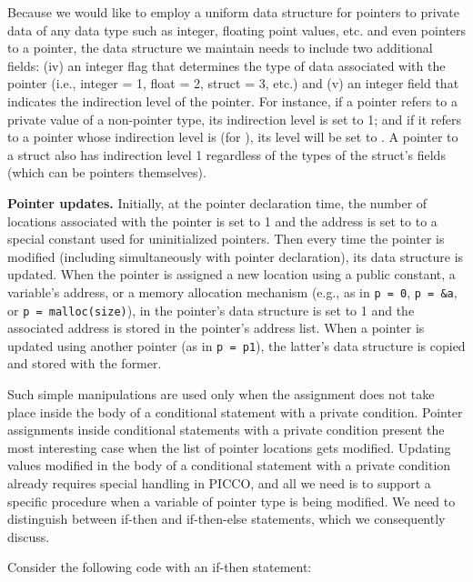 \documentclass[11pt]{article}
\begin{document}
Because we would like to employ a uniform data structure for pointers to
private data of any data type such as integer, floating point values, etc.
and even pointers to a pointer, the data structure we maintain needs to
include two additional fields: (iv) an integer flag that determines the type
of data associated with the pointer (i.e., integer = 1, float = 2, struct =
3, etc.) and (v) an integer field that indicates the indirection level of
the pointer. For instance, if a pointer refers to a private value of a
non-pointer type, its indirection level is set to 1; and if it refers to a
pointer whose indirection level is  (for ), its level will be
set to . A pointer to a struct also has indirection level 1 regardless
of the types of the struct's fields (which can be pointers themselves). 

\medskip \noindent \textbf{Pointer updates.}
Initially, at the pointer declaration time, the number of locations 
associated with the pointer is set to 1 and the address is set to to a
special constant used for uninitialized pointers. Then every time the
pointer is modified (including simultaneously with pointer declaration), its
data structure is updated. When the pointer is assigned a new location using
a public constant, a variable's address, or a memory allocation mechanism
(e.g., as in \texttt{p = 0}, \texttt{p = \&a}, or \texttt{p =
malloc(size)}),  in the pointer's data structure is set to 1 and the
associated address is stored in the pointer's address list. When a pointer
is updated using another pointer (as in \texttt{p = p1}), the latter's
data structure is copied and stored with the former. 

Such simple manipulations are used only when the assignment does not take
place inside the body of a conditional statement with a private condition.
Pointer assignments inside conditional statements with a private condition
present the most interesting case when the list of pointer locations gets
modified. Updating values modified in the body of a conditional statement
with a private condition already requires special handling in PICCO, and all
we need is to support a specific procedure when a variable of pointer type
is being modified. We need to distinguish between if-then and if-then-else
statements, which we consequently discuss. 

Consider the following code with an if-then statement:
\end{document}
